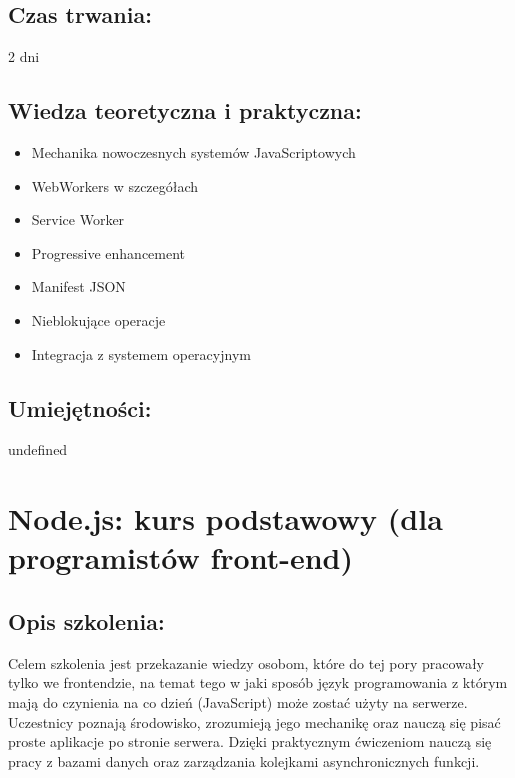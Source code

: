 \documentclass{article}[10pt]
\begin{document}
	\subsection*{Czas trwania:}
\begin{adjustwidth}{2cm}{}
	2 dni
\end{adjustwidth}

	\subsection*{Wiedza teoretyczna i praktyczna:}
\begin{adjustwidth}{1.5cm}{}
	\begin{itemize}
		\item Mechanika nowoczesnych systemów JavaScriptowych
		\item WebWorkers w szczegółach
		\item Service Worker
		\item Progressive enhancement
		\item Manifest JSON
		\item Nieblokujące operacje
		\item Integracja z systemem operacyjnym
	\end{itemize}
\end{adjustwidth}

	\subsection*{Umiejętności:}
\begin{adjustwidth}{2cm}{}
\justifying
	undefined
\end{adjustwidth}

\newpage


    
	\section{Node.js: kurs podstawowy (dla programistów front-end)}

	\subsection*{Opis szkolenia:}
	\begin{adjustwidth}{2cm}{}
\justifying
		
Celem szkolenia jest przekazanie wiedzy osobom, które do tej pory pracowały tylko we frontendzie, na temat tego w jaki sposób język programowania z którym mają do czynienia na co dzień (JavaScript) może zostać użyty na serwerze. Uczestnicy poznają środowisko, zrozumieją jego mechanikę oraz nauczą się pisać proste aplikacje po stronie serwera. Dzięki praktycznym ćwiczeniom nauczą się pracy z bazami danych oraz zarządzania kolejkami asynchronicznych funkcji.


	\end{adjustwidth}
\end{document}
